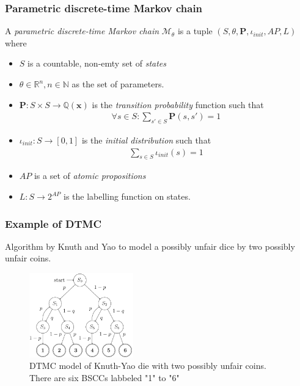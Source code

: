 \documentclass{beamer}
\begin{document}
\begin{frame}
    \frametitle{Parametric discrete-time Markov chain}
    \footnotesize{
        \begin{definition}
            \rm
            A \textit{parametric discrete-time Markov chain} $\mathcal{M}_\theta$ is a tuple $(S, \theta,
                \mathbf{P}, \iota_{init}, AP, L)$ where
            \begin{itemize}
                \item $S$ is a countable, non-emty set of \textit{states}
                \item $\theta \in \mathbb{R}^n, n \in \mathbb{N}$ as the set of  parameters.
                \item $\mathbf{P}:S\times S \rightarrow \mathbb{Q}(\mathbf{x})$ is the \textit{transition
                          probability} function such that
                      \begin{align*}
                          \forall s \in S : \sum_{s'\in S}\mathbf{P}(s, s') = 1
                      \end{align*}
                \item $\iota_{init}: S \rightarrow [0,1]$ is the \textit{initial distribution} such that
                      \begin{align*}
                          \sum_{s\in S}\iota_{init}(s) = 1
                      \end{align*}
                \item $AP$ is a set of \textit{atomic propositions}
                \item $L: S \rightarrow 2^{AP}$ is the labelling function on states.
            \end{itemize}
        \end{definition}
    }
\end{frame}

\begin{frame}
    \frametitle{Example of DTMC}
    Algorithm by Knuth and Yao \cite{knuth1976complexity} to model a possibly unfair dice by two
    possibly unfair coins.
    \begin{figure}[H]
        \centering
        \includegraphics[width=0.4\textwidth]{figures/knuth_die_pdtmc.png}
        \caption{DTMC model of Knuth-Yao die with two possibly unfair coins. There are six BSCCs labbeled "1" to "6"}
        \label{fig:knuth-die-pdtmc}
    \end{figure}
\end{frame}
\end{document}
